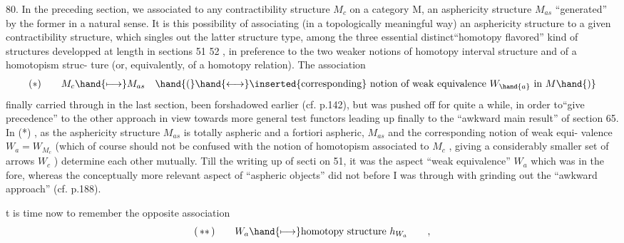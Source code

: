 80. In the preceding section, we associated to any contractibility
structure $M_{c}$ on a category M, an asphericity structure $M_{as}$ ``generated''
by the former in a natural sense. It is this possibility of associating
(in a topologically meaningful way) an asphericity structure to a given
contractibility structure, which singles out the latter structure type,
among the three essential distinct``homotopy flavored'' kind of structures
developped at length in sections 51  52 , in preference to the two
weaker notions of  homotopy interval structure\hand{,} and of a homotopism struc-%
ture (or, equivalently, of a  homotopy relation). The
association
\[ (*) \qquad M_{c} \hand{\longmapsto} M_{as} \quad \hand{(}\hand{\longleftrightarrow} \inserted{\text{corresponding}}\text{ notion of weak equivalence }W_{\hand{a}}\text{ in }M\hand{)} \]
finally carried through  in the last section,  been forshadowed
earlier (cf.  p.142), but was pushed off for quite a while, in order
to``give precedence'' to the other approach in view  towards more general
test functors\hand{,} leading up finally to the ``awkward main result'' of section
65. In  (*) , as the asphericity structure $M_{as}$ is totally aspheric
and a fortiori aspheric, $M_{as}$ and the corresponding notion of weak equi-%
valence $W_{a}= W_{M_{c}}$ (which of course should not be confused with the notion
of homotopism associated to $M_{c}$ , giving a considerably smaller set of
arrows $W_{c}$ ) determine each other mutually. Till the writing up of secti
\hand{-}on 51, it was the aspect ``weak equivalence'' $W_{a}$ which was in the fore,
whereas the  conceptually more relevant aspect of ``aspheric
objects'' did not  before I was through with
grinding out the ``awkward approach'' (cf. p.188).

 t is time now to remember the opposite association
\[ (\,**\,) \qquad W_{a} \hand{\longmapsto} \text{homotopy structure } h_{W_{a}} \qquad , \]

